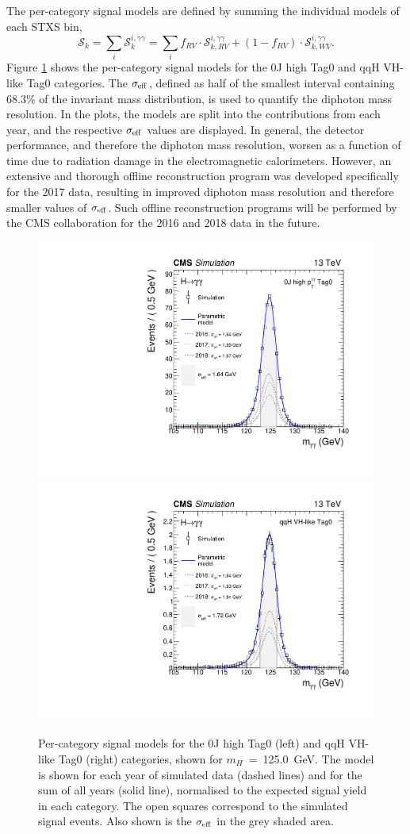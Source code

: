 The per-category signal models are defined by summing the individual models of each STXS bin,
\begin{equation}
    \mathcal{S}_k = \sum_i \mathcal{S}^{i,\gamma\gamma}_k = \sum_i f_{RV} \cdot \mathcal{S}^{i,\gamma\gamma}_{k,RV} + (1-f_{RV}) \cdot\mathcal{S}^{i,\gamma\gamma}_{k,WV}.
\end{equation}
\noindent
Figure \ref{fig:sigmodels_category} shows the per-category signal models for the 0J high \ptH Tag0 and qqH VH-like Tag0 categories. The $\sigma_{\rm{eff}}$, defined as half of the smallest interval containing 68.3\% of the invariant mass distribution, is used to quantify the diphoton mass resolution. In the plots, the models are split into the contributions from each year, and the respective $\sigma_{\rm{eff}}$ values are displayed. In general, the detector performance, and therefore the diphoton mass resolution, worsen as a function of time due to radiation damage in the electromagnetic calorimeters. However, an extensive and thorough offline reconstruction program was developed specifically for the 2017 data, resulting in improved diphoton mass resolution and therefore smaller values of $\sigma_{\rm{eff}}$. Such offline reconstruction programs will be performed by the CMS collaboration for the 2016 and 2018 data in the future. 

\begin{figure}[hptb]
  \centering
  \includegraphics[width=.45\textwidth]{Figures/hgg_stats/smodel_RECO_0J_PTH_GT10_Tag0.pdf}
  \includegraphics[width=.45\textwidth]{Figures/hgg_stats/smodel_RECO_VBFTOPO_VHHAD_Tag0.pdf}
  \caption[Signal models for the 0J high \ptgg Tag0 and qqH VH-like Tag0 categories]
  {
    Per-category signal models for the 0J high \ptH Tag0 (left) and qqH VH-like Tag0 (right) categories, shown for $m_H$~=~125.0~GeV. The model is shown for each year of simulated data (dashed lines) and for the sum of all years (solid line), normalised to the expected signal yield in each category. The open squares correspond to the simulated signal events. Also shown is the $\sigma_{\rm{eff}}$ in the grey shaded area. 
  }
  \label{fig:sigmodels_category}
\end{figure}

